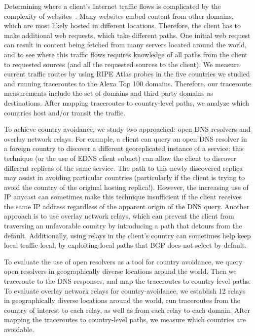 Determining where a client's Internet traffic flows is complicated by
the complexity of websites~\cite{butkiewicz2011understanding}.  Many
websites embed content from other domains, which are most likely
hosted in different locations.  Therefore, the client has to make
additional web requests, which take different paths.  One initial web
request can result in content being fetched from many servers located
around the world, and to see where this traffic flows requires knowledge
of all paths from the client to requested sources (and all the requested
sources to the client).  We measure current traffic routes by using RIPE 
Atlas probes in the five countries we studied and running traceroutes to 
the Alexa Top 100 domains.  Therefore, our traceroute measurements include the 
set of domains and third party domains as destinations.  After mapping 
traceroutes to country-level paths, we analyze which 
countries host and/or transit the traffic.

To achieve country avoidance, we study two approached: open DNS resolvers 
and overlay network relays. For
example, a client can query an open DNS resolver in a foreign country to
discover a different georeplicated instance of a service; this technique
(or the use of EDNS client subnet) can allow the client to discover
different replicas of the same service. The path to this newly
discovered replica may assist in avoiding particular countries
(particularly if the client is trying to avoid the country of the
original hosting replica!).  However, the increasing use of IP anycast can
sometimes make this technique insufficient if the client
receives the same IP address regardless of the apparent origin of the
DNS query.  Another approach is to use overlay network relays, which can
prevent the client from traversing an unfavorable country by introducing
a path that detours from the default. Additionally, using
relays in the client's country can sometimes help keep local traffic
local, by exploiting local paths that BGP does not select by default.

To evaluate the use of open resolvers as a tool for country avoidance, we
query open resolvers in geographically diverse locations around the world.  Then we traceroute 
to the DNS responses, and map the traceroutes to country-level paths.  To evaluate 
overlay network relays for country-avoidance, we establish 12 relays in geographically 
diverse locations around the world, run traceroutes from the country of interest to 
each relay, as well as from each relay to each domain.  After mapping 
the traceroutes to country-level paths, we measure which countries are 
avoidable.

